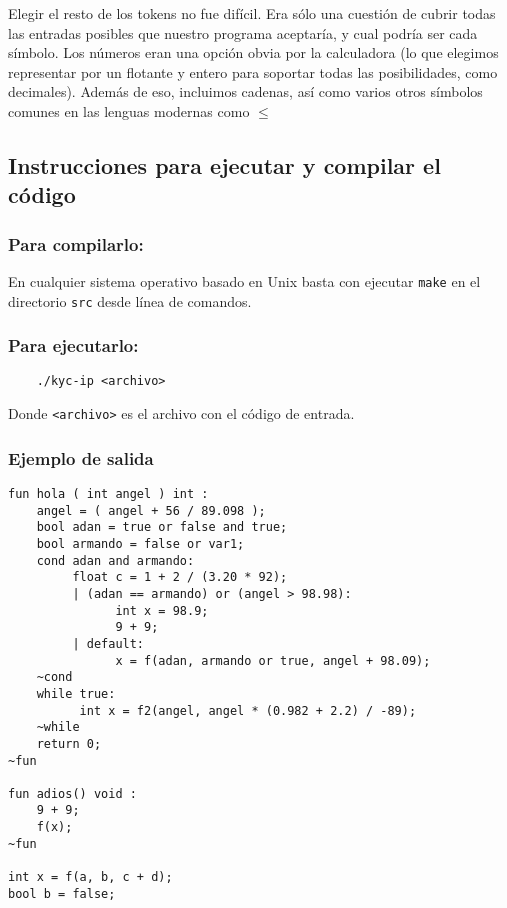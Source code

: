 \documentclass[12pt]{article}
\begin{document}
Elegir el resto de los tokens no fue difícil. Era sólo una cuestión de cubrir todas las entradas posibles que nuestro programa aceptaría, y cual podría ser cada símbolo. Los números eran una opción obvia por la calculadora (lo que elegimos representar por un flotante y entero para soportar todas las posibilidades, como decimales). Además de eso, incluimos cadenas, así como varios otros símbolos comunes en las lenguas modernas como $\leq$

\subsection*{Instrucciones para ejecutar y compilar el código}

\subsubsection*{Para compilarlo:}

En cualquier sistema operativo basado en Unix basta con ejecutar \texttt{make} en el directorio \texttt{src} desde línea de comandos. 

\subsubsection*{Para ejecutarlo:} 

\begin{verbatim}
    ./kyc-ip <archivo>
\end{verbatim}
Donde \texttt{<archivo>} es el archivo con el código de entrada.

\subsubsection*{Ejemplo de salida}
\begin{verbatim}
fun hola ( int angel ) int : 
    angel = ( angel + 56 / 89.098 );
    bool adan = true or false and true;
    bool armando = false or var1;
    cond adan and armando:
         float c = 1 + 2 / (3.20 * 92);
         | (adan == armando) or (angel > 98.98):
               int x = 98.9;
               9 + 9;
         | default:
               x = f(adan, armando or true, angel + 98.09);            
    ~cond
    while true:
          int x = f2(angel, angel * (0.982 + 2.2) / -89);            
    ~while
    return 0;
~fun

fun adios() void :
    9 + 9;
    f(x);
~fun

int x = f(a, b, c + d);
bool b = false;
\end{verbatim}
\end{document}
